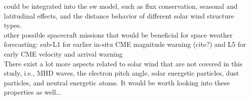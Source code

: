 could be integrated into the sw model, such as flux conservation, seasonal and latitudinal effects, and the distance behavior of different solar wind structure types.\\

other possible spacecraft missions that would be beneficial for space weather forecasting: sub-L1 for earlier in-situ CME magnitude warning (cite?) and L5 for early CME velocity and arrival warning \citep{Vourlidas2015}\\

There exist a lot more aspects related to solar wind that are not covered in this study, i.e., MHD waves, the electron pitch angle, solar energetic particles, dust particles, and neutral energetic atoms. It would be worth looking into these properties as well...\\






